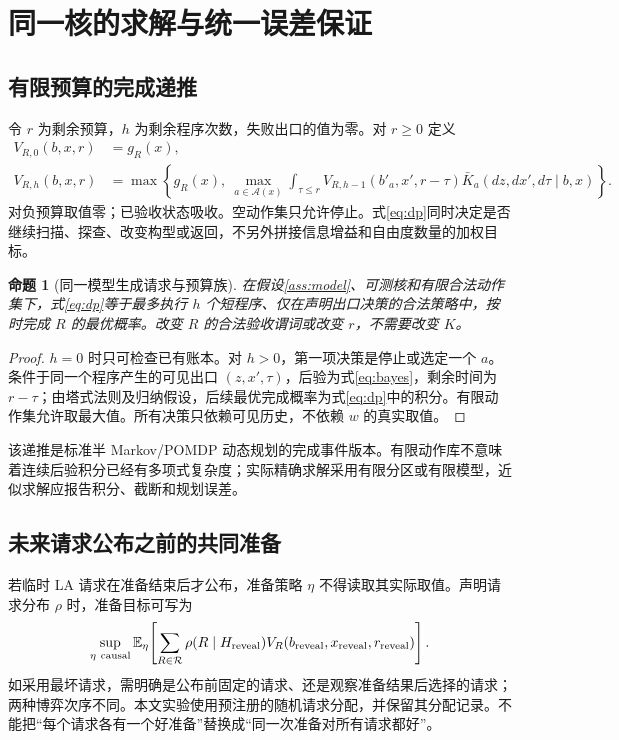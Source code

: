 \documentclass[11pt,a4paper,fontset=fandol]{ctexart}
\newtheorem{proposition}[theorem]{命题}
\theoremstyle{definition}
\theoremstyle{remark}
\numberwithin{equation}{section}
\newcommand{\E}{\mathbb E}
\newcommand{\cA}{\mathcal A}
\newcommand{\cR}{\mathcal R}
\begin{document}
\section{同一核的求解与统一误差保证}
\label{sec:solver}
\subsection{有限预算的完成递推}
令 $r$ 为剩余预算，$h$ 为剩余程序次数，失败出口的值为零。对 $r\ge0$ 定义
\begin{align}
 V_{R,0}(b,x,r)&=g_R(x),\label{eq:base}\\
 V_{R,h}(b,x,r)
 &=\max\left\{g_R(x),\
 \max_{a\in\cA(x)}
 \int_{\tau\le r}
 V_{R,h-1}(b'_a,x',r-\tau)
 \bar K_a(dz,dx',d\tau\mid b,x)
 \right\}.
 \label{eq:dp}
\end{align}
对负预算取值零；已验收状态吸收。空动作集只允许停止。式\eqref{eq:dp}同时决定是否继续扫描、探查、改变构型或返回，不另外拼接信息增益和自由度数量的加权目标。

\begin{proposition}[同一模型生成请求与预算族]
\label{prop:dp}
在假设\ref{ass:model}、可测核和有限合法动作集下，式\eqref{eq:dp}等于最多执行 $h$ 个短程序、仅在声明出口决策的合法策略中，按时完成 $R$ 的最优概率。改变 $R$ 的合法验收谓词或改变 $r$，不需要改变 $K$。
\end{proposition}
\begin{proof}
$h=0$ 时只可检查已有账本。对 $h>0$，第一项决策是停止或选定一个 $a$。条件于同一个程序产生的可见出口 $(z,x',\tau)$，后验为式\eqref{eq:bayes}，剩余时间为 $r-\tau$；由塔式法则及归纳假设，后续最优完成概率为式\eqref{eq:dp}中的积分。有限动作集允许取最大值。所有决策只依赖可见历史，不依赖 $w$ 的真实取值。
\end{proof}
该递推是标准半 Markov/POMDP 动态规划的完成事件版本\cite{partial,ais}。有限动作库不意味着连续后验积分已经有多项式复杂度；实际精确求解采用有限分区或有限模型，近似求解应报告积分、截断和规划误差。

\subsection{未来请求公布之前的共同准备}
若临时 LA 请求在准备结束后才公布，准备策略 $\eta$ 不得读取其实际取值。声明请求分布 $\rho$ 时，准备目标可写为
\begin{equation}
 \sup_{\eta\ {\rm causal}}
 \E_\eta\!\left[
 \sum_{R\in\cR}\rho(R\mid H_{\rm reveal})
 V_R(b_{\rm reveal},x_{\rm reveal},r_{\rm reveal})
 \right].
 \label{eq:prepare}
\end{equation}
如采用最坏请求，需明确是公布前固定的请求、还是观察准备结果后选择的请求；两种博弈次序不同。本文实验使用预注册的随机请求分配，并保留其分配记录。不能把“每个请求各有一个好准备”替换成“同一次准备对所有请求都好”。
\end{document}
